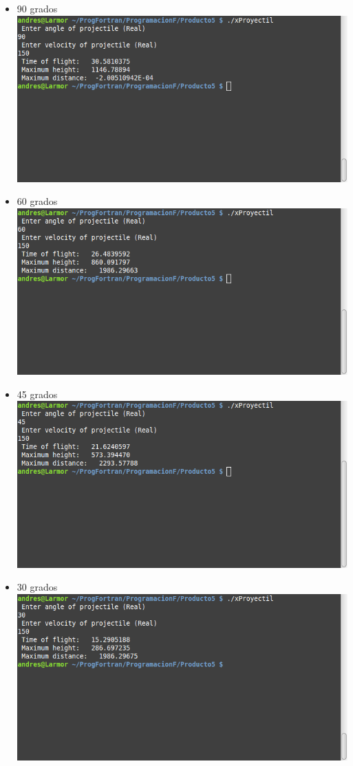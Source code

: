 \documentclass{article}
\begin{document}
\begin{itemize}

\item 90 grados\\
\includegraphics[scale=.5]{90}
\item 60 grados\\
\includegraphics[scale=.5]{60}
\item 45 grados\\
\includegraphics[scale=.5]{45}
\item 30 grados\\
\includegraphics[scale=.5]{30}

\end{itemize}
\end{document}
